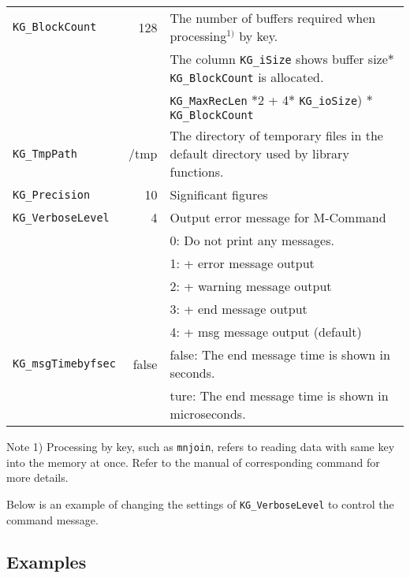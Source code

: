 \begin{table}[htpb]
\begin{center}
{\begin{tabular}{l|r|l}
\hline
\verb|KG_BlockCount|     &     128 & The number of buffers required when processing$^{1)}$ by key. \\
                         &         & The column \verb|KG_iSize| shows buffer size$*$\verb|KG_BlockCount| is allocated.\\
                         &         & \verb|KG_MaxRecLen| $*$2 + 4$*$ \verb|KG_ioSize|) $*$ \verb|KG_BlockCount| \\
\hline
\verb|KG_TmpPath|        & /tmp    & The directory of temporary files in the default directory used by library functions. \\
\hline
\verb|KG_Precision|      & 10      & Significant figures \\
\hline
\verb|KG_VerboseLevel|   &       4 & Output error message for M-Command \\
                         &         & 0: Do not print any messages. \\
                         &         & 1: + error message output \\
                         &         & 2: + warning message output \\
                         &         & 3: + end message output \\
                         &         & 4: + msg message output (default) \\
\verb|KG_msgTimebyfsec|  & false   & false: The end message time is shown in seconds. \\
                         &         & ture: The end message time is shown in microseconds. \\
\hline
\end{tabular}  
}
Note 1) Processing by key, such as \verb|mnjoin|, refers to reading data with same key into the memory at once. Refer to the manual of corresponding command for more details. 
\end{center}
\end{table}  

Below is an example of changing the settings of \verb|KG_VerboseLevel| to control the command message.

\subsection*{Examples}


%

